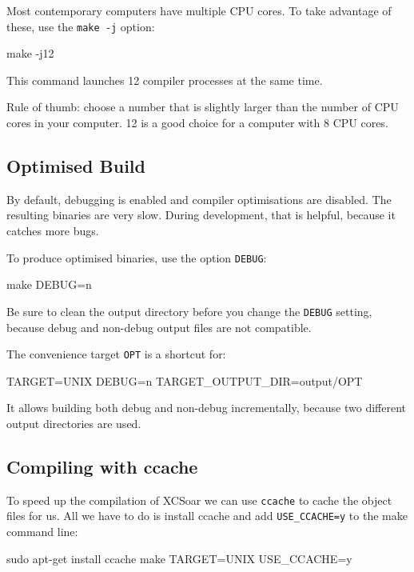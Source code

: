 Most contemporary computers have multiple CPU cores.  To take
advantage of these, use the \texttt{make -j} option:

\begin{verbatim*}
make -j12
\end{verbatim*}

This command launches 12 compiler processes at the same time.

Rule of thumb: choose a number that is slightly larger than the number
of CPU cores in your computer.  12 is a good choice for a computer
with 8 CPU cores.

\subsection{Optimised Build}

By default, debugging is enabled and compiler optimisations are
disabled.  The resulting binaries are very slow.  During development,
that is helpful, because it catches more bugs.

To produce optimised binaries, use the option \texttt{DEBUG}:

\begin{verbatim*}
make DEBUG=n
\end{verbatim*}

Be sure to clean the output directory before you change the
\texttt{DEBUG} setting, because debug and non-debug output files are
not compatible.

The convenience target \texttt{OPT} is a shortcut for:

\begin{verbatim*}
TARGET=UNIX DEBUG=n TARGET_OUTPUT_DIR=output/OPT
\end{verbatim*}

It allows building both debug and non-debug incrementally, because two
different output directories are used.

\subsection{Compiling with ccache}

To speed up the compilation of XCSoar we can use \texttt{ccache} to cache the 
object files for us. All we have to do is install ccache and 
add 
\texttt{USE\_CCACHE=y} 
to the make command line:

\begin{verbatim*}
sudo apt-get install ccache
make TARGET=UNIX USE_CCACHE=y
\end{verbatim*}
